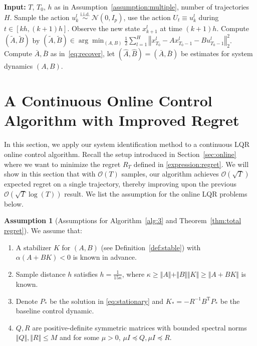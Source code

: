 \documentclass{article}
\theoremstyle{definition}
\newtheorem{assumption}{Assumption}
\begin{document}
\begin{algorithm}[t]
	\caption{Multi-trajectory system identification algorithm} \label{alg-oracle}
	\begin{algorithmic}
		\STATE \textbf{Input:} $T$, $T_{0}$, $h$ as in Assumption~\ref{assumption:multiple}, number of trajectories $H$.
		\STATE Sample the action $u^{l}_{k}\stackrel{\text { i.i.d. }}{\sim}\mathcal{N}\left(0, I_p\right)$, use the action $U_t \equiv u^{l}_{k}$  during  $t \in [kh, (k+1)h]$.
		\STATE Observe the new state $x^{l}_{k+1}$ at time $(k+1)h$.
		\ENDFOR 
		\ENDFOR
		\STATE Compute $(\widetilde{A},\widetilde{B})$ by $(\widetilde{A},\widetilde{B})\in \arg
\min_{(A,B)}\frac{1}{2}\sum_{l=1}^{H}\left\Vert x^{l}_{T_{0}}-Ax^{l}_{T_{0}-1}-Bu^{l}_{T_{0}-1}\right\Vert^{2}_{2}$.
		\STATE Compute $\bar{A},\bar{B}$ as in~\eqref{eq:recover}, let $(\hat{A},\hat{B})=(\bar{A},\bar{B})$ be estimates for system dynamics $(A,B)$.
	\end{algorithmic}
\end{algorithm}


\section{A Continuous Online Control Algorithm with Improved Regret}\label{section: online control}
In this section, we apply our system identification method to a continuous LQR online control algorithm.  Recall the setup introduced in Section~\ref{sec:online} where we want to minimize the regret $R_{T}$ defined in \eqref{expression:regret}.
We will show in this section that with $\mathcal{O}(T)$ samples, our algorithm achieves $\mathcal{O}(\sqrt{T})$ expected regret on a single trajectory, thereby improving upon the previous $\mathcal{O}\left(\sqrt{T}\log(T)\right)$ result. We list the assumption for the online LQR problems  below.

\begin{assumption}[Assumptions for Algorithm~\ref{alg:3} and Theorem~\ref{thm:total regret}]\label{assumption:alg} We assume that:
\begin{enumerate}
    \item A stabilizer $K$ for $(A,B)$ (see Definition~\ref{def:stable}) with $\alpha(A+BK)<0$ is known in advance.
    \item Sample distance $h$ satisfies $h=\frac{1}{15\kappa}$, where $\kappa\geq\Vert A\Vert +\Vert B\Vert \Vert K\Vert\geq \Vert A+BK\Vert$ is known.
    \item Denote $P_{*}$ be the solution in \eqref{eq:stationary} and $K_{*}=-R^{-1}B^{\mathrm{T}}P_{*}$ be the baseline control dynamic.
    \item $Q,R$ are positive-definite symmetric matrices with bounded spectral norms $\Vert Q\Vert,\Vert R\Vert\leq M$ and for some $\mu > 0$, $\mu I \preceq Q, \mu I \preceq R $.
\end{enumerate}
\end{assumption}
\end{document}
